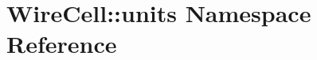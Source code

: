 \hypertarget{namespace_wire_cell_1_1units}{}\section{Wire\+Cell\+:\+:units Namespace Reference}
\label{namespace_wire_cell_1_1units}
